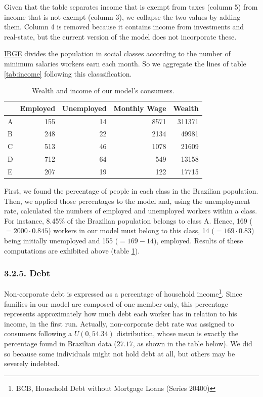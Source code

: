 \documentclass[11pt,]{article}
\begin{document}
Given that the table separates income that is exempt from taxes (column
5) from income that is not exempt (column 3), we collapse the two values
by adding them. Column 4 is removed because it contains income from
investments and real-state, but the current version of the model does
not incorporate these.

\href{https://thiagorodrigo.com.br/artigo/faixas-salariais-classe-social-abep-ibge/}{IBGE}
divides the population in social classes according to the number of
minimum salaries workers earn each month. So we aggregate the lines of
table \ref{tab:income} following this classsification.

\begin{table}

\caption{\label{tab:unnamed-chunk-21}\label{tab:inc.params} Wealth and income of our model's consumers.}
\centering
\begin{tabular}[t]{lrrrr}
\toprule
  & Employed & Unemployed & Monthly Wage & Wealth\\
\midrule
A & 155 & 14 & 8571 & 311371\\
B & 248 & 22 & 2134 & 49981\\
C & 513 & 46 & 1078 & 21609\\
D & 712 & 64 & 549 & 13158\\
E & 207 & 19 & 122 & 17715\\
\bottomrule
\end{tabular}
\end{table}

First, we found the percentage of people in each class in the Brazilian
population. Then, we applied those percentages to the model and, using
the unemployment rate, calculated the numbers of employed and unemployed
workers within a class. For instance, 8.45\% of the Brazilian population
belongs to class A. Hence, 169 (\(= 2000\cdot0.845\)) workers in our
model must belong to this class, 14 (\(= 169\cdot0.83\)) being initially
unemployed and 155 (\(= 169 - 14\)), employed. Results of these
computations are exhibited above (table \ref{tab:inc.params}).

\subsubsection{3.2.5. Debt}\label{debt}

Non-corporate debt is expressed as a percentage of household
income\footnote{BCB, Household Debt without Mortgage Loans (Series
  20400)}. Since families in our model are composed of one member only,
this percentage represents approximately how much debt each worker has
in relation to his income, in the first run. Actually, non-corporate
debt rate was assigned to consumers following a \(U(0,54.34)\)
distribution, whose mean is exactly the percentage found in Brazilian
data (\(27.17\), as shown in the table below). We did so because some
individuals might not hold debt at all, but others may be severely
indebted.
\end{document}
